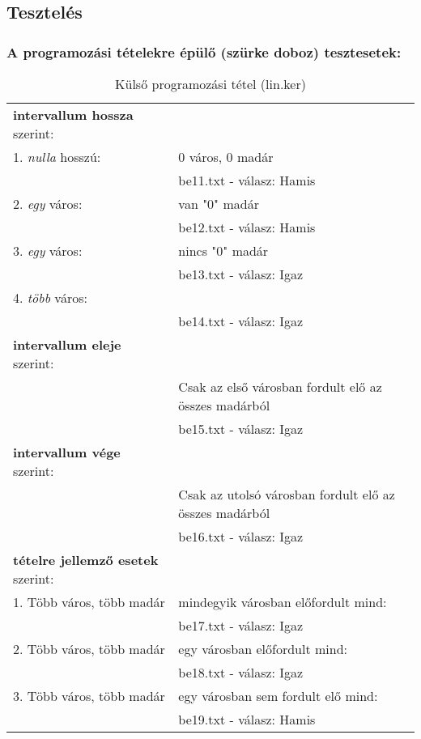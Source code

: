 \documentclass[a4paper]{article}
\begin{document}
    \subsection{Tesztelés}
      \subsubsection{A programozási tételekre épülő (szürke doboz) tesztesetek:}
      \begin{table}[H]
        \caption*{Külső programozási tétel (lin.ker)}
        \begin{tabular*}{\textwidth}{ll}
          \toprule
          \textbf{intervallum hossza} szerint: & \\
          1. \textit{nulla} hosszú: & 0 város, 0 madár \\
          & \quad be11.txt - válasz: Hamis \\
          2. \textit{egy} város: & van "0" madár  \\
          & \quad be12.txt - válasz: Hamis \\
          3. \textit{egy} város: & nincs "0" madár \\
          & \quad be13.txt - válasz: Igaz \\
          4. \textit{több} város: &  \\
          & \quad be14.txt - válasz: Igaz \\
          \textbf{intervallum eleje} szerint: & \\
          & Csak az első városban fordult elő az összes madárból \\
          & \quad be15.txt - válasz: Igaz \\
          \textbf{intervallum vége} szerint: & \\
          & Csak az utolsó városban fordult elő az összes madárból \\
          & \quad be16.txt - válasz: Igaz \\
          \textbf{tételre jellemző esetek} szerint: & \\
          1. Több város, több madár & mindegyik városban előfordult mind: \\
          & \quad be17.txt - válasz: Igaz \\
          2. Több város, több madár & egy városban előfordult mind: \\
          & \quad be18.txt - válasz: Igaz \\
          3. Több város, több madár & egy városban sem fordult elő mind: \\
          & \quad be19.txt - válasz: Hamis \\
          \bottomrule
        \end{tabular*}
      \end{table}
\end{document}
